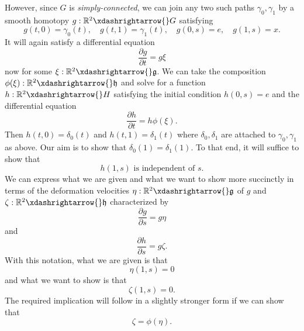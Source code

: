 \documentclass[reqno]{amsart} 
\begin{document}
However, since $G$ is \emph{simply-connected}, we can join any two such paths $\gamma_0, \gamma_1$ by a smooth homotopy $g : \mathbb{R}^2 \xdashrightarrow{} G$ satisfying
\begin{equation*}
  g(t,0) = \gamma_0(t), \quad g(t,1) = \gamma_1(t), \quad g(0,s) = e, \quad g(1,s) = x.
\end{equation*}
It will again satisfy a differential equation
\begin{equation*}
  \frac{\partial g}{\partial t} = g \xi
\end{equation*}
now for some $\xi : \mathbb{R}^2 \xdashrightarrow{} \mathfrak{g}$.  We can take the composition $\phi(\xi) : \mathbb{R}^2 \xdashrightarrow{} \mathfrak{h}$ and solve for a function $h : \mathbb{R}^2 \xdashrightarrow{} H$ satisfying the initial condition $h(0,s) = e$ and the differential equation
\begin{equation}\label{eq:velocity-h-path}
  \frac{\partial h}{\partial t}
  = h \phi(\xi).
\end{equation}
Then $h(t,0) = \delta_0(t)$ and $h(t,1) = \delta_1(t)$ where $\delta_0,\delta_1$ are attached to $\gamma_0,\gamma_1$ as above.  Our aim is to show that $\delta_0(1) = \delta_1(1)$.  To that end, it will suffice to show that
\begin{equation}\label{eq:initial-cond-h-at-1}
  \text{$h(1,s)$ is independent of $s$.}
\end{equation}
We can express what we are given and what we want to show more succinctly in terms of the deformation velocities $\eta : \mathbb{R}^2 \xdashrightarrow{} \mathfrak{g}$ of $g$ and $\zeta : \mathbb{R}^2 \xdashrightarrow{} \mathfrak{h}$ characterized by
\begin{equation}\label{eq:velocity-g-deformation}
  \frac{\partial g}{\partial s}
  = g \eta
\end{equation}
and
\begin{equation}\label{eq:velocity-h-deformation}
  \frac{\partial h}{\partial s}
  = g \zeta.
\end{equation}
With this notation, what we are given is that
\begin{equation}\label{eq:given-eta-at-s-equals-1}
  \eta(1,s) = 0
\end{equation}
and what we want to show is that
\begin{equation}\label{eq:given-zeta-at-s-equals-1}
  \zeta(1,s) = 0.
\end{equation}
The required implication will follow in a slightly stronger form if we can show that
\begin{equation}\label{eq:deformation-velocity-preserved}
  \zeta = \phi(\eta).
\end{equation}
\end{document}
